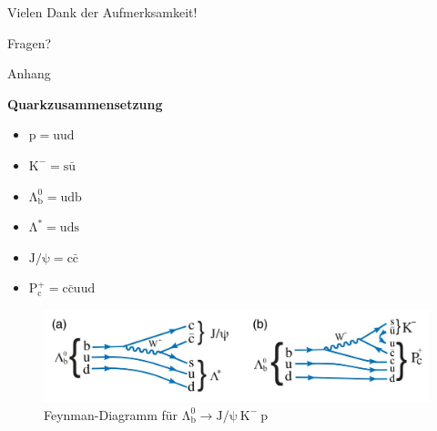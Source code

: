 \documentclass[aspectratio=169]{beamer} %
\begin{document}
    \begin{frame}{Vielen Dank der Aufmerksamkeit!}
      \begin{center}
          \Huge Fragen?
      \end{center}
  \end{frame}

\begin{frame}
\end{frame}

  \begin{frame}{Anhang}
      \begin{minipage}{0.4\textwidth}
        \textbf{Quarkzusammensetzung}
        \begin{itemize}
          \item $\mathrm{p = uud}$
          \item $\mathrm{K^- = s\bar{u}}$
          \item $\mathrm{\Lambda_b^0 = udb}$
          \item $\mathrm{\Lambda^* = uds}$
          \item $\mathrm{J/\psi = c\bar{c}}$
          \item $\mathrm{P_c^+ = c\bar{c}uud}$
        \end{itemize}
      \end{minipage}
      \hfill
      \begin{minipage}{0.58\textwidth}
        \begin{figure}
          \centering
          \includegraphics[width=\linewidth, height=0.5\textheight, keepaspectratio]{Images/98cb82e8-f82b-43ad-8d90-3c7881558f42.jpg}
          \caption{Feynman-Diagramm für $\mathrm{\Lambda_b^0} \to \mathrm{J}/\mathrm{\psi}\:\mathrm{K}^-\:\mathrm{p}$\\\scriptsize\cite{Aaij.2015}}
        \end{figure}
      \end{minipage}
      

\end{frame}
\end{document}
